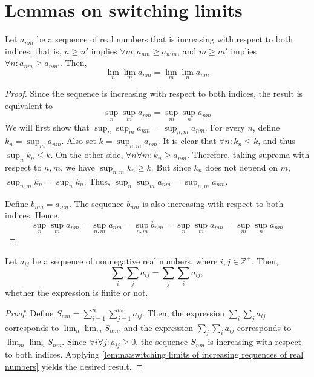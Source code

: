 
\chapter{Lemmas on switching limits}\label{chapter:Lemmas on switching limits}
\setcounter{section}{1}

\begin{lemm}\label{lemma:switching limits of increasing requences of real
numbers} Let \(a_{nm}\) be a sequence of real numbers that is increasing with
respect to both indices; that is, \(n\geq n'\) implies
\(\forall m\colon a_{nm}\geq a_{n'm}\), and \(m\geq m'\) implies
\(\forall n\colon a_{nm}\geq a_{nm'}\). Then,
	\[ \lim_{n}\lim_{m}a_{nm}=\lim_{m}\lim_{n}a_{nm}
	\]
\end{lemm}
\begin{proof} Since the sequence is increasing with respect to both indices, the
result is equivalent to
	\[ \sup_{n}\sup_{m}a_{nm}=\sup_{m}\sup_{n}a_{nm}
	\] We will first show that \(\sup_{n}\sup_{m}a_{nm}=\sup_{n,m}a_{nm}\). For
every \(n\), define \(k_{n}=\sup_{m}a_{nm}\). Also set \(k=\sup_{n,m}a_{nm}\).
It is clear that \(\forall n\colon k_{n}\leq k\), and thus
\(\sup_{n}k_{n}\leq k\). On the other side,
\(\forall n \forall m\colon k_{n}\geq a_{nm}\). Therefore, taking suprema with
respect to \(n,m\), we have \(\sup_{n,m}k_{n}\geq k\). But since \(k_{n}\) does
not depend on \(m\), \(\sup_{n,m}k_{n}=\sup_{n}k_{n}\). Thus,
\(\sup_{n}\sup_{m}a_{nm}=\sup_{n,m}a_{nm}\).
	
	Define \(b_{nm}=a_{mn}\). The sequence \(b_{nm}\) is also increasing with
respect to both indices. Hence,
	\[ \sup_{n}\sup_{m}a_{nm}=\sup_{n,m}a_{nm}=\sup_{n,m}b_{nm}=\sup_{n}\sup_{m}a_{mn}=\sup_{m}\sup_{n}a_{nm}
	\]
\end{proof}
\begin{corl}\label{corollary:switching double series} Let \(a_{ij}\) be a
sequence of nonnegative real numbers, where \(i,j\in\mathbb{Z}^+\). Then,
	\[\sum_i\sum_j a_{ij}=\sum_j\sum_i a_{ij},\] whether the expression is
finite or not.
\end{corl}
\begin{proof} Define \(S_{nm}=\sum_{i=1}^{n}\sum_{j=1}^{m}a_{ij}\). Then, the
expression \(\sum_i\sum_j a_{ij}\) corresponds to \(\lim_{n}\lim_{m}S_{nm}\),
and the expression \(\sum_j\sum_i a_{ij}\) corresponds to
\(\lim_{m}\lim_{n}S_{nm}\). Since \(\forall i\forall j\colon a_{ij}\geq 0\), the
sequence \(S_{nm}\) is increasing with respect to both indices. Applying
\cref{lemma:switching limits of increasing requences of real numbers} yields the
desired result.
\end{proof}

